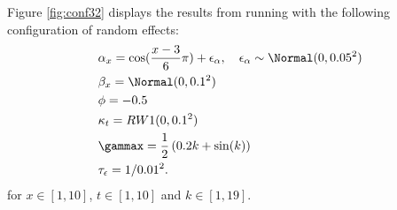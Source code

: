 Figure \ref{fig:conf32} displays the results from running \inlabru with the following configuration of random effects:
\begin{equation}
    \begin{aligned}
        &\alpha_x = \cos(\frac{x-3}{6}\pi) + \epsilon_{\alpha}, \quad \epsilon_{\alpha} \sim \Normal(0,0.05^2)\\
        &\beta_x = \Normal(0,0.1^2)\\
        &\phi = -0.5\\
        &\kappa_t = RW1(0,0.1^2)\\
        &\gammax = \frac{1}{2}\left( 0.2k + \sin(k)\right)\\
        &\tau_{\epsilon} = 1/0.01^2.
    \end{aligned}
    \label{eq:conf32}
\end{equation}
for $x\in[1,10]$, $t \in [1,10]$ and $k \in [1,19]$. 

